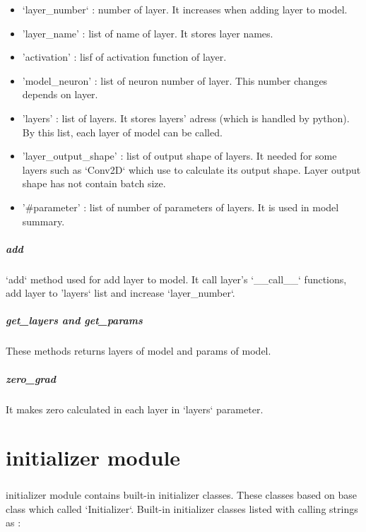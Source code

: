 \documentclass[12pt]{report}
\begin{document}
\begin{itemize}
	\item `layer\_number` : number of layer. It increases when adding layer to model. 
	\item 'layer\_name' : list of name of layer. It stores layer names. 
	\item 'activation' : lisf of activation function of layer. 
	\item 'model\_neuron' : list of neuron number of layer. This number changes depends on layer. 
	\item 'layers' : list of layers. It stores layers' adress (which is handled by python). By this list, each layer of model can be called.
	\item 'layer\_output\_shape' : list of output shape of layers. It needed for some layers such as `Conv2D` which use to calculate its output shape. Layer output shape has not contain batch size.
	\item '\#parameter' : list of number of parameters of layers. It is used in model summary.
\end{itemize}

\paragraph{add}
`add` method used for add layer to model. It call layer's `\_\_call\_\_` functions, add layer to 'layers` list and increase `layer\_number`.

\paragraph{get\_layers and get\_params}
These methods returns layers of model and params of model.

\paragraph{zero\_grad}
It makes zero calculated in each layer in `layers` parameter.

\enlargethispage{\baselineskip}






\chapter{initializer module}

\paragraph{}
initializer module contains built-in initializer classes. These classes based on base class which called `Initializer`. Built-in initializer classes listed with calling strings as : 
\end{document}
